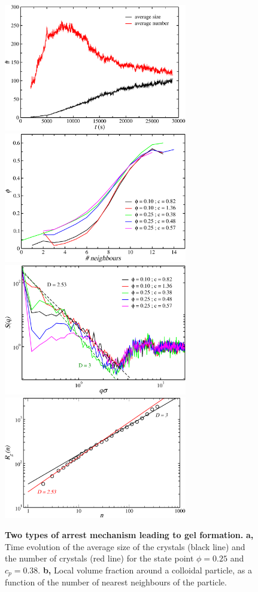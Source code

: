 \documentclass[a4paper,preprint,superscriptaddress]{revtex4}
\begin{document}
\clearpage 

\begin{figure}[!t]
 \centering
 \includegraphics[width=8cm]{oldfig/fig3a}
 \includegraphics[width=8cm]{oldfig/fig3b}
 \includegraphics[width=8cm]{oldfig/fig3c}
 \includegraphics[width=8cm]{oldfig/fig3d}
 \caption{{\bf Two types of arrest mechanism leading to gel formation.} {\bf a,} Time evolution of the average size of the crystals (black line) and the number of crystals (red line) for the state point $\phi=0.25$ and $c_p=0.38$. {\bf b,} Local volume fraction around a colloidal particle, as a function of the number of nearest neighbours of the particle.
}
\end{figure}
\end{document}
